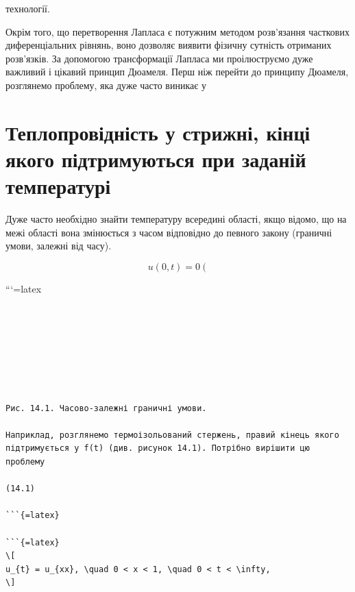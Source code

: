 \documentclass[
  ukrainian,
]{article}
\begin{document}
технології.

Окрім того, що перетворення Лапласа є потужним методом розв'язання
часткових диференціальних рівнянь, воно дозволяє виявити фізичну
сутність отриманих розв'язків. За допомогою трансформації Лапласа ми
проілюструємо дуже важливий і цікавий принцип Дюамеля. Перш ніж перейти
до принципу Дюамеля, розглянемо проблему, яка дуже часто виникає у

\section{Теплопровідність у стрижні, кінці якого підтримуються при
заданій
температурі}\label{ux442ux435ux43fux43bux43eux43fux440ux43eux432ux456ux434ux43dux456ux441ux442ux44c-ux443-ux441ux442ux440ux438ux436ux43dux456-ux43aux456ux43dux446ux456-ux44fux43aux43eux433ux43e-ux43fux456ux434ux442ux440ux438ux43cux443ux44eux442ux44cux441ux44f-ux43fux440ux438-ux437ux430ux434ux430ux43dux456ux439-ux442ux435ux43cux43fux435ux440ux430ux442ux443ux440ux456}

Дуже часто необхідно знайти температуру всередині області, якщо відомо,
що на межі області вона змінюється з часом відповідно до певного закону
(граничні умови, залежні від часу).

\[
u(0,t)=0 \left(
\]

```{=latex}
\[
\begin{aligned} \\ \\ \\ \\ \\ \\ \\ \\ \\ \\ \\ \\ \\ \\ \\ \\ \\ \\ \\ \end{aligned}
\]

\begin{verbatim}

Рис. 14.1. Часово-залежні граничні умови.

Наприклад, розглянемо термоізольований стержень, правий кінець якого підтримується у f(t) (див. рисунок 14.1). Потрібно вирішити цю проблему

(14.1)

```{=latex}

```{=latex}
\[
u_{t} = u_{xx}, \quad 0 < x < 1, \quad 0 < t < \infty,
\]
\end{verbatim}
\end{document}
